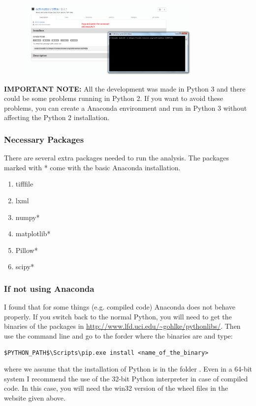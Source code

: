 \documentclass[12pt]{article}
\begin{document}
\begin{figure}[h]
\centering
\includegraphics[width=0.8\textwidth]{binstar_install.png}
\end{figure}

\textbf{IMPORTANT NOTE:} All the development was made in Python 3 and there could be some problems running in Python 2. If you want to avoid these problems, you can create a Anaconda environment and run in Python 3 without affecting the Python 2 installation.

\subsubsection{Necessary Packages}

There are several extra packages needed to run the analysis. The packages marked with * come with the basic Anaconda installation.

\begin{enumerate}
\item{tifffile}
\item{lxml}
\item{numpy*}
\item{matplotlib*}
\item{Pillow*}
\item{scipy*}
\end{enumerate}

\subsubsection{If not using Anaconda}

I found that for some things (e.g. compiled code) Anaconda does not behave properly. If you switch back to the normal Python, you will need to get the binaries of the packages in \url{http://www.lfd.uci.edu/~gohlke/pythonlibs/}. Then use the command line and go to the forder where the binaries are and type:

\begin{verbatim}
$PYTHON_PATH$\Scripts\pip.exe install <name_of_the_binary>
\end{verbatim}
where we assume that the installation of Python is in the folder . Even in a 64-bit system I recommend the use of the 32-bit Python interpreter in case of compiled code. In this case, you will need the win32 version of the wheel files in the website given above.
\end{document}
